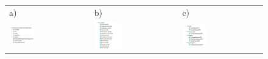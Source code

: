 \begin{figure}[htb]
  \centering
	\begin{tabular}{@{}lll@{}}
	a) & b) & c) \\
  \includegraphics[width=0.33\textwidth]{rys05/backend/ogolne.pdf} & 
	\includegraphics[width=0.33\textwidth]{rys05/backend/controller.pdf} &
	\includegraphics[width=0.33\textwidth]{rys05/backend/dto.pdf} \\


\end{tabular}
\end{figure}
